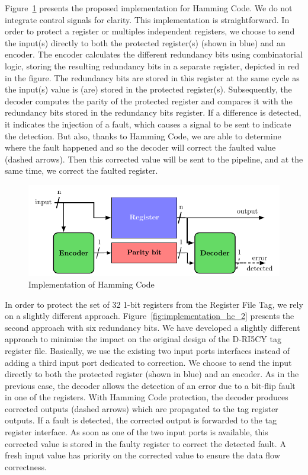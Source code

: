 Figure~\ref{fig:implementation_hc_1} presents the proposed implementation for Hamming Code. We do not integrate control signals for clarity. This implementation is straightforward. In order to protect a register or multiples independent registers, we choose to send the input(s) directly to both the protected register(s) (shown in blue) and an encoder. The encoder calculates the different redundancy bits using combinatorial logic, storing the resulting redundancy bits in a separate register, depicted in red in the figure. The redundancy bits are stored in this register at the same cycle as the input(s) value is (are) stored in the protected register(s). Subsequently, the decoder computes the parity of the protected register and compares it with the redundancy bits stored in the redundancy bits register. If a difference is detected, it indicates the injection of a fault, which causes a signal to be sent to indicate the detection. But also, thanks to Hamming Code, we are able to determine where the fault happened and so the decoder will correct the faulted value (dashed arrows). Then this corrected value will be sent to the pipeline, and at the same time, we correct the faulted register.

\begin{figure}[ht]
    \centering
    \includegraphics[page=2, width=\textwidth]{c5_countermeasures_dift/img/archi_contremesures.pdf}
    \caption{Implementation of Hamming Code}
    \label{fig:implementation_hc_1}
\end{figure}

In order to protect the set of 32 1-bit registers from the Register File Tag, we rely on a slightly different approach. Figure~\ref{fig:implementation_hc_2} presents the second approach with six redundancy bits.
We have developed a slightly different approach to minimise the impact on the original design of the D-RI5CY tag register file. Basically, we use the existing two input ports interfaces instead of adding a third input port dedicated to correction. We choose to send the input directly to both the protected register (shown in blue) and an encoder. 
As in the previous case, the decoder allows the detection of an error due to a bit-flip fault in one of the registers. With Hamming Code protection, the decoder produces corrected outputs (dashed arrows) which are propagated to the tag register outputs. If a fault is detected, the corrected output is forwarded to the tag register interface. As soon as one of the two input ports is available, this corrected value is stored in the faulty register to correct the detected fault. A fresh input value has priority on the corrected value to ensure the data flow correctness. 

